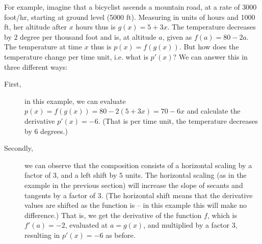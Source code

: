 For example, imagine that a bicyclist ascends a mountain road,
at a rate of $3000$
foot/hr, starting at ground level (5000 ft). Measuring in units of hours and
1000 ft, her altitude after $x$ hours thus is $g(x)=5+3x$. 
The temperature decreases by $2$ degree per thousand foot and is, at
altitude $a$, given as $f(a)=80-2a$. The temperature at time $x$ thus is
$p(x)=f(g(x))$. But how does the temperature change per time unit, i.e. what
is $p'(x)$? We can answer this in three different ways:

\begin{description}
\item[First,] in this example, we can evaluate $p(x)=f(g(x))=80-2(5+3x)=70-6x$ and
calculate the derivative $p'(x)=-6$. (That is per time unit, the temperature
decreases by 6 degrees.)

\item[Secondly,] we can observe that the composition consists of a horizontal
scaling by a factor of 3, and a left shift by $5$ units. The horizontal
scaling (as in the example in the previous section) will increase the slope
of secants and tangents by a factor of $3$. (The horizontal shift means that
the derivative values are shifted as the function is -- in this example this
will make no difference.) That is, we get the derivative of the function
$f$, which is $f'(a)=-2$, evaluated at $a=g(x)$, and multiplied by a factor
$3$, resulting in $p'(x)=-6$ as before.


\end{description}
